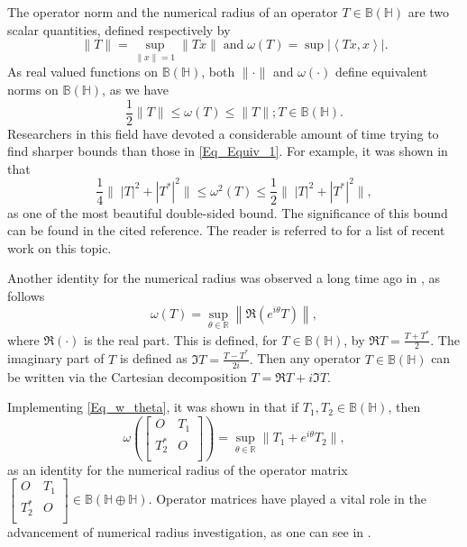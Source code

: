 \documentclass[12pt,twoside,reqno]{amsart}
\numberwithin{equation}{section}
\begin{document}
The operator norm and the numerical radius of an operator $T\in\mathbb{B}(\mathbb{H})$ are two scalar quantities, defined respectively by
\[\|T\|=\sup_{\|x\|=1}\|Tx\|\;{\text{and}}\;\omega(T)=\sup|\left<Tx,x\right>|.\]
As real valued functions on $\mathbb{B}(\mathbb{H})$, both $\|\cdot\|$ and $\omega(\cdot)$ define equivalent norms on $\mathbb{B}(\mathbb{H})$, as we have \cite[Theorem 1.3-1]{Gustafson_Book_1997}
\begin{equation}\label{Eq_Equiv_1}
\frac{1}{2}\|T\|\leq\omega(T)\leq\|T\|; T\in\mathbb{B}(\mathbb{H}).
\end{equation}
Researchers in this field have devoted a considerable amount of time trying to find sharper bounds than those in \eqref{Eq_Equiv_1}. For example, it was shown in \cite{Kittaneh_Studia_2005} that
\begin{equation}
\frac{1}{4}\|\;|T|^2+|T^*|^2\|\leq\omega^2(T)\leq \frac{1}{2}\|\;|T|^2+|T^*|^2\|,
\end{equation}
as one of the most beautiful double-sided bound. The significance of this bound can be found in the cited reference. The reader is referred to \cite{Bhunia_ArchMath_2021, Haj_Georgian_2021, Hoss_Slovaca_2020, Sababheh_JAAC_2023, Sababheh_CAOT_2024} for a list of recent work on this topic.

Another identity for the numerical radius was observed a long time ago in \cite{Haagerup_PAMS_1992}, as follows
\begin{equation}\label{Eq_w_theta}
\omega(T)=\sup_{\theta\in\mathbb{R}}\left\|\Re\left(e^{i\theta}T\right)\right\|,
\end{equation}
where $\Re(\cdot)$ is the real part. This is defined, for $T\in\mathbb{B}(\mathbb{H})$, by $\Re T=\frac{T+T^*}{2}.$ The imaginary part of $T$ is defined as $\Im T=\frac{T-T^*}{2i}.$ Then any operator $T\in\mathbb{B}(\mathbb{H})$ can be written via the Cartesian decomposition $T=\Re T+i\Im T$.


Implementing \eqref{Eq_w_theta}, it was shown in \cite{Hirzallah_IEOT_2011} that if $T_1,T_2\in\mathbb{B}(\mathbb{H})$, then
\begin{equation}\label{Eq_Ident_Bl}
\omega \left( \left[ \begin{matrix}
   O & {{T}_{1}}  \\
   T_{2}^{*} & O  \\
\end{matrix} \right] \right)=\sup_{\theta\in\mathbb{R}}\|T_1+e^{i\theta}T_2\|,
\end{equation}
as an identity for the numerical radius of the operator matrix $\left[ \begin{matrix}
   O & {{T}_{1}}  \\
   T_{2}^{*} & O  \\
\end{matrix} \right]\in\mathbb{B}(\mathbb{H}\oplus\mathbb{H}).$ Operator matrices have played a vital role in the advancement of numerical radius investigation, as one can see in \cite{Abu-Omar_LAA_2015, Conde_GMJ_2024, Feki_Georgian_2023, Hajmohamadi_JMI_2018, Qiao_JMI_2022, Shebrawi_LAA_2017}.
\end{document}
